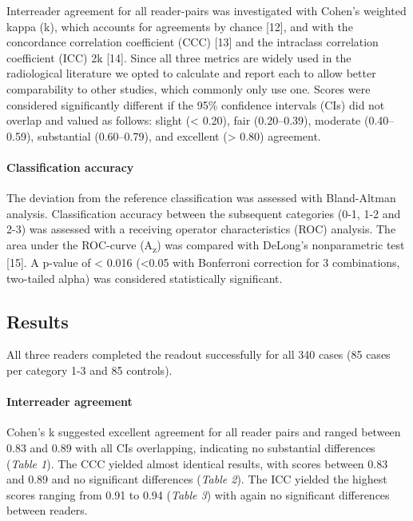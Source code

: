 \documentclass[]{elsarticle} %
\begin{document}
Interreader agreement for all reader-pairs was investigated with Cohen's
weighted kappa (k), which accounts for agreements by chance {[}12{]},
and with the concordance correlation coefficient (CCC) {[}13{]} and the
intraclass correlation coefficient (ICC) 2k {[}14{]}. Since all three
metrics are widely used in the radiological literature we opted to
calculate and report each to allow better comparability to other
studies, which commonly only use one. Scores were considered
significantly different if the 95\% confidence intervals (CIs) did not
overlap and valued as follows: slight (\textless{} 0.20), fair
(0.20--0.39), moderate (0.40--0.59), substantial (0.60--0.79), and
excellent (\textgreater{} 0.80) agreement.

\paragraph{Classification accuracy}\label{classification-accuracy}

The deviation from the reference classification was assessed with
Bland-Altman analysis. Classification accuracy between the subsequent
categories (0-1, 1-2 and 2-3) was assessed with a receiving operator
characteristics (ROC) analysis. The area under the ROC-curve
(A\textsubscript{z}) was compared with DeLong's nonparametric test
{[}15{]}. A p-value of \textless{} 0.016 (\textless{}0.05 with
Bonferroni correction for 3 combinations, two-tailed alpha) was
considered statistically significant.

\subsection{Results}\label{results}

All three readers completed the readout successfully for all 340 cases
(85 cases per category 1-3 and 85 controls).

\paragraph{Interreader agreement}\label{interreader-agreement-1}

Cohen's k suggested excellent agreement for all reader pairs and ranged
between 0.83 and 0.89 with all CIs overlapping, indicating no
substantial differences (\emph{Table 1}). The CCC yielded almost
identical results, with scores between 0.83 and 0.89 and no significant
differences (\emph{Table 2}). The ICC yielded the highest scores ranging
from 0.91 to 0.94 (\emph{Table 3}) with again no significant differences
between readers.
\end{document}
